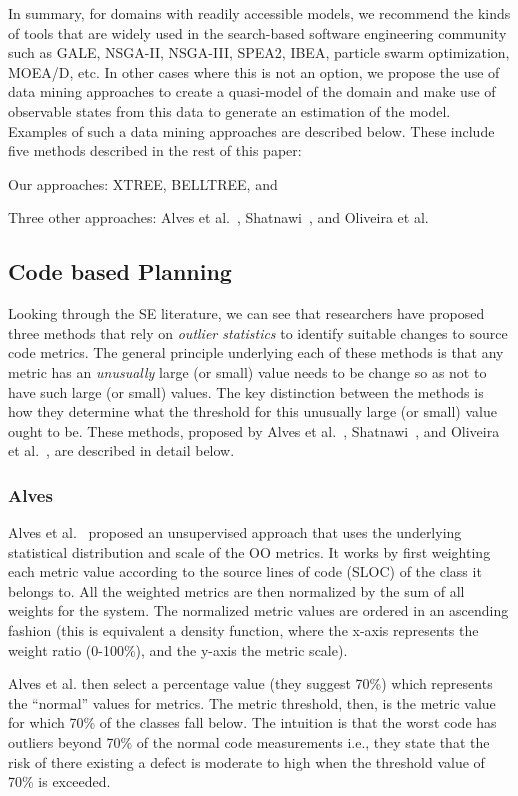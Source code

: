 In summary, for domains with readily accessible models, we recommend the kinds of tools that are widely used in the search-based software engineering community such as GALE, NSGA-II, NSGA-III, SPEA2, IBEA, particle swarm optimization, MOEA/D, etc. In other cases where this is not an option, we propose the use of data mining approaches to create a quasi-model of the domain and make use of observable states from this data to generate an estimation of the model. Examples of such a data mining approaches are described below. These include five methods described in the rest of this paper: 
\bi
\item Our approaches: XTREE, BELLTREE, and 
\item Three other approaches: Alves et al.~\citep{alves}, Shatnawi~\citep{shatnawi}, and Oliveira et al.~\citep{oliveira} 
\ei

\subsection{Code based Planning}
Looking through the SE literature, we can see that researchers have proposed three methods that rely on \textit{outlier statistics} to identify suitable changes to source code metrics. The general principle underlying each of these methods is that any metric has an \textit{unusually} large (or small) value needs to be change so as not to have such large (or small) values. The key distinction between the methods is how they determine what the threshold for this unusually large  (or small) value ought to be. These methods, proposed by Alves et al.~\citep{alves}, Shatnawi~\citep{shatnawi}, and Oliveira et al.~\citep{oliveira}, are described in detail below.


\subsubsection{Alves}
Alves et al.~\citep{alves} proposed an unsupervised approach
that uses the underlying statistical 
distribution and scale of the OO metrics. It works by first weighting each metric value according to the source lines of 
code (SLOC) of the class it belongs to. All the weighted metrics are then normalized by the sum of all weights for the system. The normalized metric values are ordered in an ascending fashion (this is
equivalent a density function, where the x-axis represents 
the weight ratio (0-100\%), and the y-axis the metric scale).

Alves et al. then select a percentage value (they suggest 70\%) which 
represents the ``normal'' values for metrics. The metric threshold, then, 
is the metric value for which 70\% of the classes fall below. The 
intuition is that the worst code has outliers beyond 70\% of the normal 
code measurements i.e., they state that the risk of there existing a defect 
is moderate to high when the threshold value of 70\% is exceeded.

